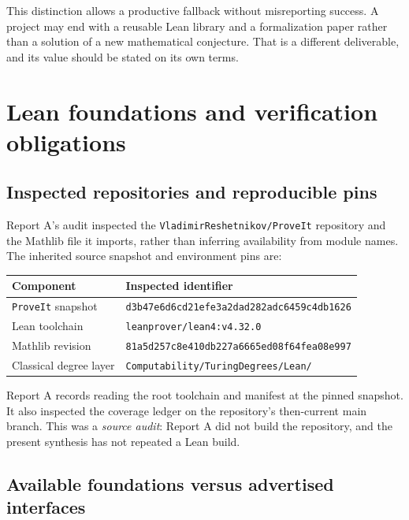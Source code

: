 \documentclass[11pt,a4paper]{article}
\theoremstyle{definition}\newtheorem{definition}[theorem]{Definition}
\theoremstyle{remark}\newtheorem{remark}[theorem]{Remark}
\begin{document}
This distinction allows a productive fallback without misreporting success. A project may end with a reusable Lean library and a formalization paper rather than a solution of a new mathematical conjecture. That is a different deliverable, and its value should be stated on its own terms.



\section{Lean foundations and verification obligations}
\label{sec:lean}

\subsection{Inspected repositories and reproducible pins}

Report A's audit inspected the \texttt{VladimirReshetnikov/ProveIt} repository and the Mathlib file it imports, rather than inferring availability from module names. The inherited source snapshot and environment pins are:
\begin{center}
\begin{tabularx}{\textwidth}{@{}lX@{}}
\toprule
Component & Inspected identifier \\
\midrule
\texttt{ProveIt} snapshot & \texttt{d3b47e6d6cd21efe3a2dad282adc6459c4db1626} \\
Lean toolchain & \texttt{leanprover/lean4:v4.32.0} \\
Mathlib revision & \texttt{81a5d257c8e410db227a6665ed08f64fea08e997} \\
Classical degree layer & \texttt{Computability/TuringDegrees/Lean/} \\
\bottomrule
\end{tabularx}
\end{center}
Report A records reading the root toolchain and manifest at the pinned snapshot. It also inspected the coverage ledger on the repository's then-current main branch. This was a \emph{source audit}: Report A did not build the repository, and the present synthesis has not repeated a Lean build.\cite{ProveIt,ProveItCoverage,Mathlib}

\subsection{Available foundations versus advertised interfaces}
\end{document}
